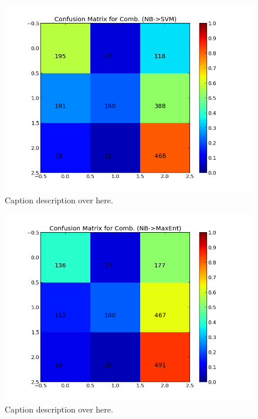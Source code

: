 \begin{minipage}[c]{\linewidth}
     \begin{minipage}{0.45\linewidth}
          \begin{figure}[H]
               \includegraphics[width=\linewidth]{../img/plots/grid/confusion_matrix_Comb-NB-SVM.png}
           \caption[Results overview across models]{Caption description over here.}
           \label{fig:confmat_nb_svm}
          \end{figure}
     \end{minipage}
     \hspace{0.05\linewidth}
     \begin{minipage}{0.45\linewidth}
          \begin{figure}[H]
               \includegraphics[width=\linewidth]{../img/plots/grid/confusion_matrix_Comb-NB-MaxEnt.png}
           \caption[Results overview across models]{Caption description over here.}
           \label{fig:confmat_nb_maxent}
          \end{figure}
     \end{minipage}
\end{minipage}


